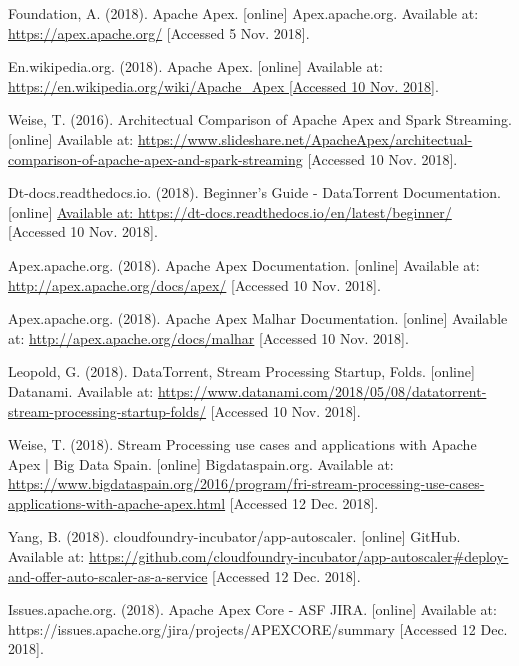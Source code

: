 \documentclass[final]{IEEEtran}
\begin{document}
\begin{thebibliography}{99}
  Foundation, A. (2018). Apache Apex. [online] Apex.apache.org. Available at: \url{https://apex.apache.org/} [Accessed 5 Nov. 2018].
  
  En.wikipedia.org. (2018). Apache Apex. [online] Available at: \url{https://en.wikipedia.org/wiki/Apache_Apex [Accessed 10 Nov. 2018]}.
  
  Weise, T. (2016). Architectual Comparison of Apache Apex and Spark Streaming. [online] Available at: \url{https://www.slideshare.net/ApacheApex/architectual-comparison-of-apache-apex-and-spark-streaming} [Accessed 10 Nov. 2018].

  Dt-docs.readthedocs.io. (2018). Beginner's Guide - DataTorrent Documentation. [online] \url{Available at: https://dt-docs.readthedocs.io/en/latest/beginner/} [Accessed 10 Nov. 2018].

  Apex.apache.org. (2018). Apache Apex Documentation. [online] Available at: \url{http://apex.apache.org/docs/apex/} [Accessed 10 Nov. 2018].

  Apex.apache.org. (2018). Apache Apex Malhar Documentation. [online] Available at: \url{http://apex.apache.org/docs/malhar} [Accessed 10 Nov. 2018].

  Leopold, G. (2018). DataTorrent, Stream Processing Startup, Folds. [online] Datanami. Available at: \url{https://www.datanami.com/2018/05/08/datatorrent-stream-processing-startup-folds/} [Accessed 10 Nov. 2018].

  Weise, T. (2018). Stream Processing use cases and applications with Apache Apex | Big Data Spain. [online] Bigdataspain.org. Available at: \url{https://www.bigdataspain.org/2016/program/fri-stream-processing-use-cases-applications-with-apache-apex.html} [Accessed 12 Dec. 2018].

  Yang, B. (2018). cloudfoundry-incubator/app-autoscaler. [online] GitHub. Available at: \url{https://github.com/cloudfoundry-incubator/app-autoscaler\#deploy-and-offer-auto-scaler-as-a-service} [Accessed 12 Dec. 2018].

  Issues.apache.org. (2018). Apache Apex Core - ASF JIRA. [online] Available at: https://issues.apache.org/jira/projects/APEXCORE/summary [Accessed 12 Dec. 2018].
\end{thebibliography}
\end{document}
